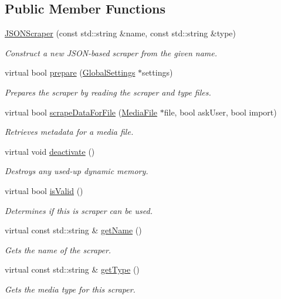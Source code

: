 \subsection*{Public Member Functions}
\begin{DoxyCompactItemize}
\item 
\hyperlink{class_a_w_e_1_1_j_s_o_n_scraper_a3d115de6594a974a48bc5655dab8118c}{J\-S\-O\-N\-Scraper} (const std\-::string \&name, const std\-::string \&type)
\begin{DoxyCompactList}\small\item\em Construct a new J\-S\-O\-N-\/based scraper from the given name. \end{DoxyCompactList}\item 
virtual bool \hyperlink{class_a_w_e_1_1_j_s_o_n_scraper_a1b12fde072ef979911fcca4191c3c2a7}{prepare} (\hyperlink{class_a_w_e_1_1_global_settings}{Global\-Settings} $\ast$settings)
\begin{DoxyCompactList}\small\item\em Prepares the scraper by reading the scraper and type files. \end{DoxyCompactList}\item 
virtual bool \hyperlink{class_a_w_e_1_1_j_s_o_n_scraper_afbed287c0fcae8d797552c711854b4e9}{scrape\-Data\-For\-File} (\hyperlink{class_a_w_e_1_1_media_file}{Media\-File} $\ast$file, bool ask\-User, bool import)
\begin{DoxyCompactList}\small\item\em Retrieves metadata for a media file. \end{DoxyCompactList}\item 
virtual void \hyperlink{class_a_w_e_1_1_j_s_o_n_scraper_a0d1a05a4c7273ff1063518592d68501a}{deactivate} ()
\begin{DoxyCompactList}\small\item\em Destroys any used-\/up dynamic memory. \end{DoxyCompactList}\item 
virtual bool \hyperlink{class_a_w_e_1_1_j_s_o_n_scraper_abb4ca61ee617b473198a635c6f3ac57d}{is\-Valid} ()
\begin{DoxyCompactList}\small\item\em Determines if this is scraper can be used. \end{DoxyCompactList}\item 
virtual const std\-::string \& \hyperlink{class_a_w_e_1_1_j_s_o_n_scraper_a77c2ed4ece4a88876f6381b97d6c5a93}{get\-Name} ()
\begin{DoxyCompactList}\small\item\em Gets the name of the scraper. \end{DoxyCompactList}\item 
virtual const std\-::string \& \hyperlink{class_a_w_e_1_1_j_s_o_n_scraper_a5b540056aa7ddf4e343220b0a54a0279}{get\-Type} ()
\begin{DoxyCompactList}\small\item\em Gets the media type for this scraper. \end{DoxyCompactList}\end{DoxyCompactItemize}



